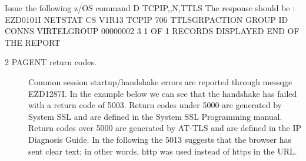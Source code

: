 \documentclass[letterpaper,10pt,english]{sphinxmanual}
\begin{document}
\begin{sphinxVerbatim}[commandchars=\\\{\}]
Issue the following z/OS command \textendash{} D TCPIP,,N,TTLS
The response should be :
    EZD0101I NETSTAT CS V1R13 TCPIP 706
    TTLSGRPACTION GROUP ID CONNS
    VIRTELGROUP 00000002 3
    1 OF 1 RECORDS DISPLAYED
    END OF THE REPORT
\end{sphinxVerbatim}
\begin{description}
\item[{2   PAGENT return codes.}] \leavevmode
Common session startup/handshake errors are reported through messqge EZD1287I. In the example below we can see that the handshake has failed with a return code of 5003. Return codes under 5000 are generated by System SSL and are defined in the System SSL Programming manual. Return codes over 5000 are generated by AT-TLS and are defined in the IP Diagnosis Guide. In the following the 5013 suggests that the browser has sent clear text; in other words, http was used instead of https in the URL.

\end{description}
\end{document}
